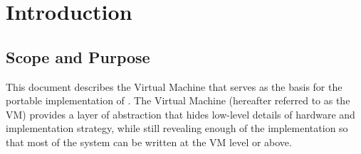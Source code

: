 \chapter{Introduction} %


\section{Scope and Purpose}

This document describes the Virtual Machine that serves as the basis for the
portable implementation of \ccl.  The Virtual Machine (hereafter referred to as
the VM) provides a layer of abstraction that hides low-level details of
hardware and implementation strategy, while still revealing enough of the
implementation so that most of the system can be written at the VM level or
above.

